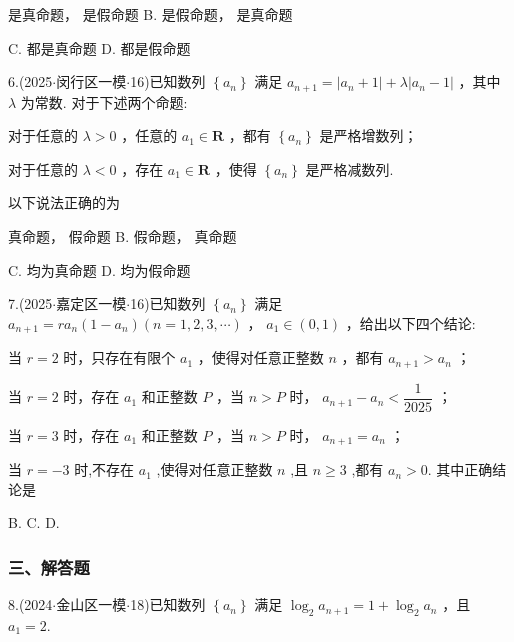 \xx{}{}{}{}  是真命题，  是假命题 B.   是假命题，  是真命题

C.     都是真命题 D.     都是假命题

6.(2025$\cdot$闵行区一模$\cdot$16)已知数列 $\left\{  {a}_{n}\right\}$ 满足 ${a}_{n + 1} = \left| {{a}_{n} + 1}\right|  + \lambda \left| {{a}_{n} - 1}\right|$ ，其中 $\lambda$ 为常数. 对于下述两个命题:

   对于任意的 $\lambda  > 0$ ，任意的 ${a}_{1} \in  \mathbf{R}$ ，都有 $\left\{  {a}_{n}\right\}$ 是严格增数列；

   对于任意的 $\lambda  < 0$ ，存在 ${a}_{1} \in  \mathbf{R}$ ，使得 $\left\{  {a}_{n}\right\}$ 是严格减数列.

以下说法正确的为 \dotfill{(\kh{})}

\xx{}{}{}{}  真命题，  假命题 B.   假命题，  真命题

C.     均为真命题 D.     均为假命题



7.(2025$\cdot$嘉定区一模$\cdot$16)已知数列 $\left\{  {a}_{n}\right\}$ 满足 ${a}_{n + 1} = r{a}_{n}\left( {1 - {a}_{n}}\right) \left( {n = 1,2,3,\cdots }\right)$ ， ${a}_{1} \in  \left( {0,1}\right)$ ，给出以下四个结论:

   当 $r = 2$ 时，只存在有限个 ${a}_{1}$ ，使得对任意正整数 $n$ ，都有 ${a}_{n + 1} > {a}_{n}$ ；

   当 $r = 2$ 时，存在 ${a}_{1}$ 和正整数 $P$ ，当 $n > P$ 时， ${a}_{n + 1} - {a}_{n} < \dfrac{1}{2025}$ ；

   当 $r = 3$ 时，存在 ${a}_{1}$ 和正整数 $P$ ，当 $n > P$ 时， ${a}_{n + 1} = {a}_{n}$ ；

   当 $r =  - 3$ 时,不存在 ${a}_{1}$ ,使得对任意正整数 $n$ ,且 $n \geq  3$ ,都有 ${a}_{n} > 0$. 其中正确结论是 \dotfill{(\kh{})}

\xx{}{}{}{}     B.      C.      D.     

\subsubsection*{三、解答题}

8.(2024$\cdot$金山区一模$\cdot$18)已知数列 $\left\{  {a}_{n}\right\}$ 满足 ${\log }_{2}{a}_{n + 1} = 1 + {\log }_{2}{a}_{n}$ ，且 ${a}_{1} = 2$.

